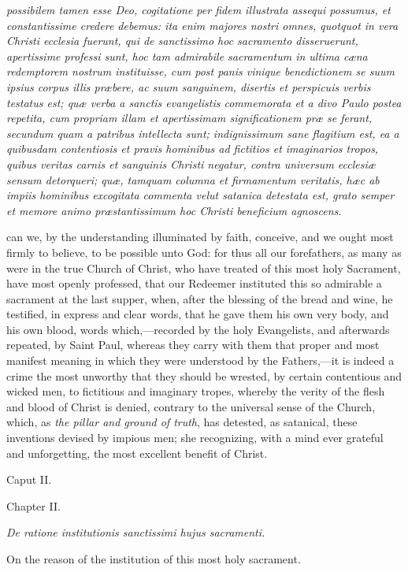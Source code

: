 \emph{possibilem tamen esse Deo, cogitatione per fidem illustrata assequi possumus, et constantissime credere debemus: ita enim majores nostri omnes, quotquot in vera Christi ecclesia fuerunt, qui de sanctissimo hoc sacramento disseruerunt, apertissime professi sunt, hoc tam admirabile sacramentum in ultima cæna redemptorem nostrum instituisse, cum post panis vinique benedictionem se suum ipsius corpus illis præbere, ac suum sanguinem, disertis et perspicuis verbis testatus est; quæ verba a sanctis evangelistis commemorata et a divo Paulo postea repetita, cum propriam illam et apertissimam significationem præ se ferant, secundum quam a patribus intellecta sunt; indignissimum sane flagitium est, ea a quibusdam contentiosis et pravis hominibus ad fictitios et imaginarios tropos, quibus veritas carnis et sanguinis Christi negatur, contra universum ecclesiæ sensum detorqueri; quæ, tamquam columna et firmamentum veritatis, hæc ab impiis hominibus excogitata commenta velut satanica detestata est, grato semper et memore animo præstantissimum hoc Christi beneficium agnoscens.}

can we, by the understanding illuminated by faith, conceive, and we ought most firmly to believe, to be possible unto God: for thus all our forefathers, as many as were in the true Church of Christ, who have treated of this most holy Sacrament, have most openly professed, that our Redeemer instituted this so admirable a sacrament at the last supper, when, after the blessing of the bread and wine, he testified, in express and clear words, that he gave them his own very body, and his own blood, words which,—recorded by the holy Evangelists, and afterwards repeated, by Saint Paul, whereas they carry with them that proper and most manifest meaning in which they were understood by the Fathers,—it is indeed a crime the most unworthy that they should be wrested, by certain contentious and wicked men, to fictitious and imaginary tropes, whereby the verity of the flesh and blood of Christ is denied, contrary to the universal sense of the Church, which, as \emph{the pillar and ground of truth}, has detested, as satanical, these inventions devised by impious men; she recognizing, with a mind ever grateful and unforgetting, the most excellent benefit of Christ.

Caput II.

Chapter II.

\emph{De ratione institutionis sanctissimi hujus sacramenti.}

On the reason of the institution of this most holy sacrament.

